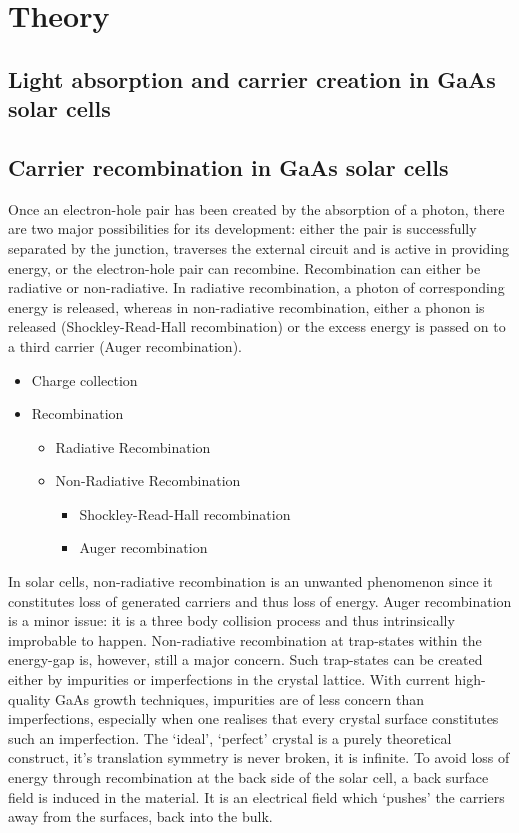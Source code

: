 \documentclass[a4paper]{article}
\begin{document}
\section{Theory}

\subsection{Light absorption and carrier creation in GaAs solar cells}


\subsection{Carrier recombination in GaAs solar cells}
Once an electron-hole pair has been created by the absorption of a photon, there are two major possibilities for its development: either the pair is successfully separated by the junction, traverses the external circuit and is active in providing energy, or the electron-hole pair can recombine. Recombination can either be radiative or non-radiative. In radiative recombination, a photon of corresponding energy is released, whereas in non-radiative recombination, either a phonon is released (Shockley-Read-Hall recombination) or the excess energy is passed on to a third carrier (Auger recombination).
\begin{itemize}
\item Charge collection
\item Recombination
	\begin{itemize}
	\item Radiative Recombination
	\item Non-Radiative Recombination
		\begin{itemize}
		\item Shockley-Read-Hall recombination
		\item Auger recombination
		\end{itemize}
	\end{itemize}
\end{itemize}
In solar cells, non-radiative recombination is an unwanted phenomenon since it constitutes loss of generated carriers and thus loss of energy. Auger recombination is a minor issue: it is a three body collision process and thus intrinsically improbable to happen. Non-radiative recombination at trap-states within the energy-gap is, however, still a major concern. Such trap-states can be created either by impurities or imperfections in the crystal lattice. With current high-quality GaAs growth techniques, impurities are of less concern than imperfections, especially when one realises that every crystal surface constitutes such an imperfection. The `ideal', `perfect' crystal is a purely theoretical construct, it's translation symmetry is never broken, it is infinite. To avoid loss of energy through recombination at the back side of the solar cell, a back surface field is induced in the material. It is an electrical field which `pushes' the carriers away from the surfaces, back into the bulk.
\end{document}
